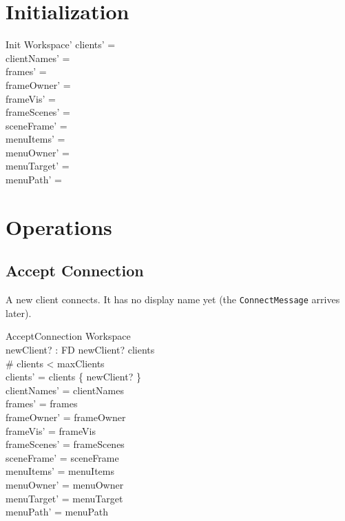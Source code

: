 \documentclass[a4paper,10pt,fleqn]{article}
\begin{document}
\section{Initialization}

\begin{schema}{Init}
  Workspace'
  \where
  clients' = \emptyset \\
  clientNames' = \emptyset \\
  frames' = \emptyset \\
  frameOwner' = \emptyset \\
  frameVis' = \emptyset \\
  frameScenes' = \emptyset \\
  sceneFrame' = \emptyset \\
  menuItems' = \emptyset \\
  menuOwner' = \emptyset \\
  menuTarget' = \emptyset \\
  menuPath' = \emptyset
\end{schema}

\section{Operations}

\subsection{Accept Connection}

A new client connects.  It has no display name yet (the
\texttt{ConnectMessage} arrives later).

\begin{schema}{AcceptConnection}
  \Delta Workspace \\
  newClient? : FD
  \where
  newClient? \notin clients \\
  \# clients < maxClients \\
  clients' = clients \cup \{ newClient? \} \\
  clientNames' = clientNames \\
  frames' = frames \\
  frameOwner' = frameOwner \\
  frameVis' = frameVis \\
  frameScenes' = frameScenes \\
  sceneFrame' = sceneFrame \\
  menuItems' = menuItems \\
  menuOwner' = menuOwner \\
  menuTarget' = menuTarget \\
  menuPath' = menuPath
\end{schema}
\end{document}
